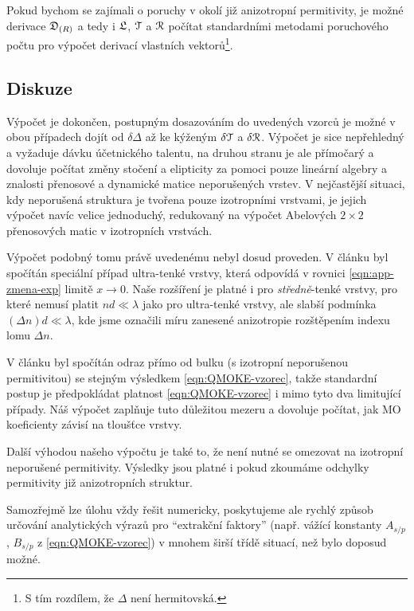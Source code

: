 Pokud bychom se zajímali o poruchy v okolí již anizotropní permitivity, je možné derivace $\mathfrak{D}_{(R)}$ a tedy i $\mathfrak{L}$, $\mathcal{T}$ a $\mathcal{R}$ počítat standardními metodami poruchového počtu pro výpočet derivací vlastních vektorů\footnote{S tím rozdílem, že $\Delta$ není hermitovská.}.

\subsection*{Diskuze}

Výpočet je dokončen, postupným dosazováním do uvedených vzorců je možné v obou případech dojít od $\delta\Delta$ až ke kýženým $\delta\mathcal{T}$ a $\delta\mathcal{R}$.
Výpočet je sice nepřehledný a vyžaduje dávku účetnického talentu, na druhou stranu je ale přímočarý a dovoluje počítat změny stočení a elipticity za pomoci pouze lineární algebry a znalosti přenosové a dynamické matice neporušených vrstev.
V nejčastější situaci, kdy neporušená struktura je tvořena pouze izotropními vrstvami, je jejich výpočet navíc velice jednoduchý\cite{vigoureuxPolynomialFormulationReflection1991}, redukovaný na výpočet Abelových $2\times2$ přenosových matic v izotropních vrstvách.

Výpočet podobný tomu právě uvedenému nebyl dosud proveden.
V článku \cite{hamrleVicinalInterfaceSensitive2003} byl spočítán speciální případ ultra-tenké vrstvy, která odpovídá v rovnici \eqref{eqn:app-zmena-exp} limitě $x\to0$. 
Naše rozšíření je platné i pro \emph{středně}-tenké vrstvy, pro které nemusí platit $nd\ll\lambda$ jako pro ultra-tenké vrstvy, ale slabší podmínka $(\Delta n)d\ll\lambda$, kde jsme označili míru zanesené anizotropie rozštěpením indexu lomu $\Delta n$.

V článku \cite{postavaAnisotropyQuadraticMagnetooptic2002} byl spočítán odraz přímo od bulku (s izotropní neporušenou permitivitou) se stejným výsledkem \eqref{eqn:QMOKE-vzorec}, takže standardní postup je předpokládat platnost \eqref{eqn:QMOKE-vzorec} i mimo tyto dva limitující případy\cite{hamrleHugeQuadraticMagnetooptical2007,kuschelVectorialMagnetometryUsing2011}.
Náš výpočet zaplňuje tuto důležitou mezeru a dovoluje počítat, jak MO koeficienty závisí na tloušťce vrstvy.

Další výhodou našeho výpočtu je také to, že není nutné se omezovat na izotropní neporušené permitivity.
Výsledky jsou platné i pokud zkoumáme odchylky permitivity již anizotropních struktur.

Samozřejmě lze úlohu vždy řešit numericky, poskytujeme ale rychlý způsob určování analytických výrazů pro ``extrakční faktory'' (např. vážící konstanty $A_{s/p}$, $B_{s/p}$ z \eqref{eqn:QMOKE-vzorec}) v mnohem širší třídě situací, než bylo doposud možné.


